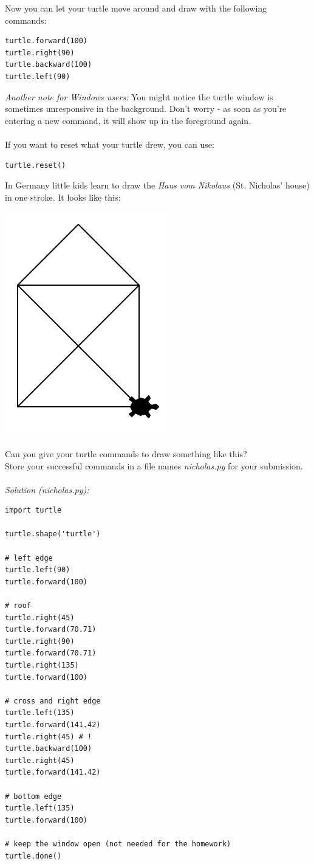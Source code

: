 \documentclass{article}
\begin{document}
Now you can let your turtle move around and draw with the following commands:
\begin{lstlisting}
turtle.forward(100)
turtle.right(90)
turtle.backward(100)
turtle.left(90)
\end{lstlisting}
\textit{Another note for Windows users:} You might notice the turtle window is
sometimes unresponsive in the background. Don't worry - as soon as you're entering
a new command, it will show up in the foreground again.\\\\
If you want to reset what your turtle drew, you can use:
\begin{lstlisting}
turtle.reset()
\end{lstlisting}
In Germany little kids learn to draw the \textit{Haus vom Nikolaus} (St. Nicholas' house)
in one stroke. It looks like this:\\
\begin{center}
\includegraphics[scale=1]{Ex_1_Nicholas}
\end{center}
Can you give your turtle commands to draw something like this?\\
Store your successful commands in a file names \textit{nicholas.py} for your submission.\\\\
\textit{Solution (nicholas.py):}
\begin{lstlisting}
import turtle

turtle.shape('turtle')

# left edge
turtle.left(90)
turtle.forward(100)

# roof
turtle.right(45)
turtle.forward(70.71)
turtle.right(90)
turtle.forward(70.71)
turtle.right(135)
turtle.forward(100)

# cross and right edge
turtle.left(135)
turtle.forward(141.42)
turtle.right(45) # !
turtle.backward(100)
turtle.right(45)
turtle.forward(141.42)

# bottom edge
turtle.left(135)
turtle.forward(100)

# keep the window open (not needed for the homework)
turtle.done()
\end{lstlisting}
\end{document}
